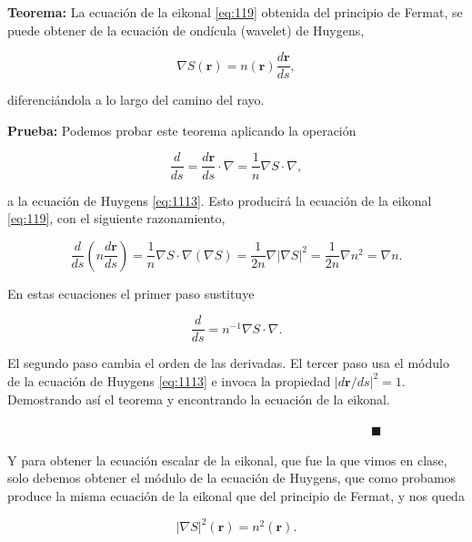 \documentclass[a4paper,10pt]{article}
\numberwithin{equation}{section}
\newcommand{\teorema}{\textbf{Teorema: }}
\newcommand{\prueba}{\textbf{Prueba: }}
\begin{document}
\begin{mdframed}[linewidth=2]
 \teorema La ecuación de la eikonal \eqref{eq:119} obtenida del principio de Fermat, 
 se puede obtener de la ecuación de ondícula (wavelet) de Huygens, 
 
 \begin{equation}
  \nabla S(\mathbf{r}) = n(\mathbf{r})\frac{d\mathbf{r}}{ds},
  \label{eq:1113}
 \end{equation}
 
 diferenciándola a lo largo del camino del rayo.
\end{mdframed}

\vspace{.3cm}

\prueba Podemos probar este teorema aplicando la operación 

\begin{equation}
 \frac{d}{ds} = \frac{d\mathbf{r}}{ds}\cdot \nabla = \frac{1}{n}\nabla S \cdot \nabla, 
\end{equation}

a la ecuación de Huygens \eqref{eq:1113}. Esto producirá la ecuación de la eikonal
\eqref{eq:119}, con el siguiente razonamiento, 

\begin{equation}
 \frac{d}{ds}\left(n\frac{d\mathbf{r}}{ds} \right) = \frac{1}{n}\nabla S \cdot \nabla 
 (\nabla S) = \frac{1}{2n}\nabla|\nabla S|^2 = \frac{1}{2n}\nabla n^2 = \nabla n.
\end{equation}

En estas ecuaciones el primer paso sustituye 

\begin{equation}
 \frac{d}{ds} = n^{-1}\nabla S \cdot \nabla.
\end{equation}

El segundo paso cambia el orden de las derivadas. El tercer paso usa el módulo de 
la ecuación de Huygens \eqref{eq:1113} e invoca la propiedad $|d\mathbf{r}/ds|^2 = 1$.
Demostrando así el teorema y encontrando la ecuación de la eikonal.

$\hspace{12cm} \blacksquare$

Y para obtener la ecuación escalar de la eikonal, que fue la que vimos en clase, 
solo debemos obtener el módulo de la ecuación de Huygens, que como probamos produce 
la misma ecuación de la eikonal que del principio de Fermat, y nos queda 

\begin{equation}
 |\nabla S|^2(\mathbf{r}) = n^2(\mathbf{r}).
 \label{eq:eikonalescalar}
\end{equation}
\end{document}
